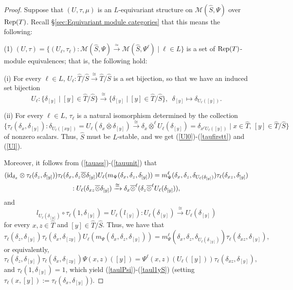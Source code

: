 \documentclass{amsart}
\theoremstyle{definition}
\newcommand{\id}{{\rm id}}
\newcommand{\Rep}{{\rm Rep}}
\newcommand{\M}{\mathscr{M}}
\newcommand{\ot}{\otimes}
\numberwithin{equation}{section}
\begin{document}
\begin{proof}
Suppose that $(U,\tau,\mu)$ is an $L$-equivariant structure on $\M(\widehat{S},\Psi)$ over $\Rep(T)$. Recall \S\ref{sec:Equivariant module categories} that this means the following:

(1) $(U,\tau)=\{(U_{\ell},\tau_{\ell}):\M(\widehat{S},\Psi)\xrightarrow{\simeq} \M(\widehat{S},\Psi^{\ell})\mid \ell\in L\}$ 
is a set of $\Rep(T)$-module equivalences; that is, the following hold: 

(i) For every $\ell\in L$, $U_{\ell}:\widehat{T}/\widehat{S}\xrightarrow{\cong}\widehat{T}/\widehat{S}$ is a set bijection, so that we have an induced set bijection
$$U_{\ell}:\{\delta_{[y]}\mid [y]\in \widehat{T}/\widehat{S}\}\xrightarrow{\cong}\{\delta_{[y]}\mid [y]\in\widehat{T}/\widehat{S}\},\,\,\,\delta_{[y]}\mapsto \delta_{U_{\ell}([y])}.$$

(ii) For every $\ell\in L$, $\tau_{\ell}$ is a natural isomorphism determined by the collection 
$$\{\tau_{\ell}(\delta_x,\delta_{[y]}):\delta_{U_{\ell}([xy])}=U_{\ell}(\delta_{x}\overline{\ot}\delta_{[y]})\xrightarrow{\cong}\delta_{x}\overline{\ot}^{\ell} U_{\ell}(\delta_{[y]})=\delta_{x^{\ell}U_{\ell}([y])}\mid x\in \widehat{T},\,[y]\in \widehat{T}/\widehat{S}\}$$
of nonzero scalars. 
Thus, $\widehat{S}$ must be $L$-stable, and we get (\ref{Ul0})-(\ref{taufirstt}) and (\ref{Ul}). 

Moreover, it follows from (\ref{tauass})-(\ref{tauunit}) that 
\begin{gather*}
(\id_{\delta_{x}}\ot \tau_{\ell}(\delta_z,\delta_{[y]}))\tau_{\ell}(\delta_x,\delta_{z}\overline{\ot}\delta_{[y]})U_{\ell}(m_{\Psi}(\delta_x,\delta_z,\delta_{[y]}))
= m_{\Psi}^{\ell}(\delta_x,\delta_z,\delta_{U_{\ell}(\delta_{[y]})})\tau_{\ell}(\delta_{xz},\delta_{[y]})\\
:U_{\ell}(\delta_{xz}\overline{\ot} \delta_{[y]})\xrightarrow{\cong} \delta_{x}\overline{\ot}^{\ell}(\delta_{z}\overline{\ot}^{\ell} U_{\ell}(\delta_{[y]})),
\end{gather*}
and
\begin{equation*}
l_{U_{\ell}(\delta_{[y]})}\circ\tau_{\ell}(1,\delta_{[y]})=U_{\ell}(l_{[y]}):U_{\ell}(\delta_{[y]})\xrightarrow{\cong} U_{\ell}(\delta_{[y]})
\end{equation*}
for every $x,z\in\widehat{T}$ and $[y]\in \widehat{T}/\widehat{S}$.
Thus, we have that
$$\tau_{\ell}(\delta_z,\delta_{[y]})\tau_{\ell}(\delta_x,\delta_{[zy]})U_{\ell}(m_{\Psi}(\delta_x,\delta_z,\delta_{[y]}))= m_{\Psi}^{\ell}(\delta_x,\delta_z,\delta_{U_{\ell}(\delta_{[y]})})\tau_{\ell}(\delta_{xz},\delta_{[y]}),$$
or equivalently,
$$\tau_{\ell}(\delta_z,\delta_{[y]})\tau_{\ell}(\delta_x,\delta_{[zy]})\Psi(x,z)([y])= \Psi^{\ell}(x,z)(U_{\ell}([y]))\tau_{\ell}(\delta_{xz},\delta_{[y]}),$$
and $\tau_{\ell}(1,\delta_{[y]})=1$, which yield (\ref{taulPsi})-(\ref{taul1yS}) (setting $\tau_{\ell}(x,[y]):=\tau_{\ell}(\delta_x,\delta_{[y]})$).


\end{proof}
\end{document}
